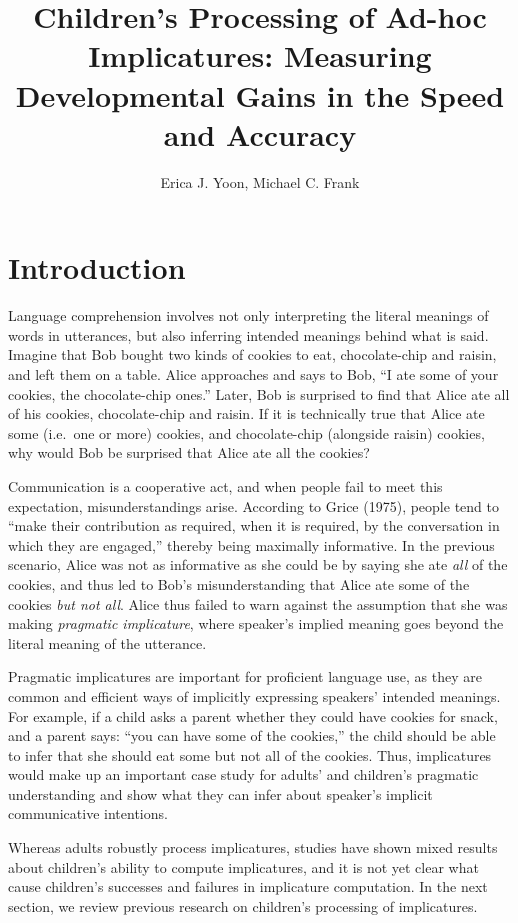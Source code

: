 \documentclass[a4paper,man,apacite,floatsintext]{apa6}
\date{}
\title{\textbf{Children's Processing of Ad-hoc Implicatures: Measuring Developmental
Gains in the Speed and Accuracy}}
\author{Erica J. Yoon, Michael C. Frank}
\affiliation{Department of Psychology, Stanford University}
\begin{document}
\maketitle

\section{Introduction}\label{introduction}

Language comprehension involves not only interpreting the literal
meanings of words in utterances, but also inferring intended meanings
behind what is said. Imagine that Bob bought two kinds of cookies to
eat, chocolate-chip and raisin, and left them on a table. Alice
approaches and says to Bob, ``I ate some of your cookies, the
chocolate-chip ones.'' Later, Bob is surprised to find that Alice ate
all of his cookies, chocolate-chip and raisin. If it is technically true
that Alice ate some (i.e.~one or more) cookies, and chocolate-chip
(alongside raisin) cookies, why would Bob be surprised that Alice ate
all the cookies?

Communication is a cooperative act, and when people fail to meet this
expectation, misunderstandings arise. According to Grice (1975), people
tend to ``make their contribution as required, when it is required, by
the conversation in which they are engaged,'' thereby being maximally
informative. In the previous scenario, Alice was not as informative as
she could be by saying she ate \emph{all} of the cookies, and thus led
to Bob's misunderstanding that Alice ate some of the cookies \emph{but
not all}. Alice thus failed to warn against the assumption that she was
making \emph{pragmatic implicature}, where speaker's implied meaning
goes beyond the literal meaning of the utterance.

Pragmatic implicatures are important for proficient language use, as
they are common and efficient ways of implicitly expressing speakers'
intended meanings. For example, if a child asks a parent whether they
could have cookies for snack, and a parent says: ``you can have some of
the cookies,'' the child should be able to infer that she should eat
some but not all of the cookies. Thus, implicatures would make up an
important case study for adults' and children's pragmatic understanding
and show what they can infer about speaker's implicit communicative
intentions.

Whereas adults robustly process implicatures, studies have shown mixed
results about children's ability to compute implicatures, and it is not
yet clear what cause children's successes and failures in implicature
computation. In the next section, we review previous research on
children's processing of implicatures.
\end{document}
